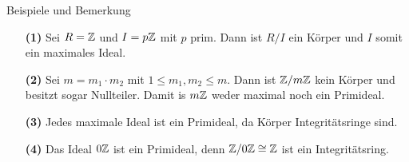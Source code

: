 \begin{genericdf}{Beispiele und Bemerkung}\label{skript:8.15} \
	\begin{enumerate}
		\item[\textbf{(1)}]
		Sei $R = \mathbb{Z}$ und $I = p \mathbb{Z}$ mit $p$ prim.
		Dann ist $R/I$ ein Körper und $I$ somit ein maximales Ideal.
		
		\item[\textbf{(2)}]
		Sei $m = m_1 \cdot m_2$ mit $1 \leq m_1, m_2 \leq m$.
		Dann ist $\mathbb{Z} / m \mathbb{Z}$ kein Körper und besitzt sogar Nullteiler.
		Damit is $m \mathbb{Z}$ weder maximal noch ein Primideal.
		
		\item[\textbf{(3)}]
		Jedes maximale Ideal ist ein Primideal, da Körper Integritätsringe sind.
		
		\item[\textbf{(4)}]	
		Das Ideal $0 \mathbb{Z}$ ist ein Primideal, denn $\mathbb{Z} / 0 \mathbb{Z} \cong \mathbb{Z}$ ist ein Integritätsring.	
	\end{enumerate}
\end{genericdf}


